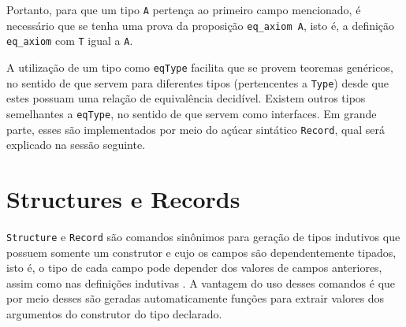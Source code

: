 Portanto, para que um tipo \lstinline[language = coq]$A$
pertença ao primeiro campo mencionado, é necessário que se tenha uma prova da proposição \lstinline[language = coq]$eq_axiom A$, isto é, 
a definição \lstinline[language = coq]$eq_axiom$ com 
\lstinline[language = coq]$T$ igual a \lstinline[language = coq]$A$.


A utilização de um tipo como \lstinline[language = coq]$eqType$ facilita que se provem teoremas genéricos, no sentido de que servem para diferentes tipos (pertencentes a \lstinline[language = coq]$Type$) desde que estes possuam uma relação de equivalência decidível. Existem outros tipos semelhantes a \lstinline[language = coq]$eqType$, no sentido de que servem como interfaces. Em grande parte, esses são implementados por meio do açúcar sintático \lstinline[language = coq]$Record$, qual será explicado na sessão seguinte.

\section{Structures e Records} 
\label{section:structs-e-records}

\lstinline[language = coq]$Structure$ e \lstinline[language = coq]$Record$ são comandos sinônimos para geração de tipos indutivos que possuem somente um construtor e cujo os campos são dependentemente tipados, isto é, o tipo de cada campo pode depender dos valores de campos anteriores, assim como nas definições indutivas \cite{assia_mahboubi_2022_7118596}. A vantagem do uso desses comandos é que por meio desses são geradas automaticamente funções para extrair valores dos argumentos do construtor do tipo declarado.

